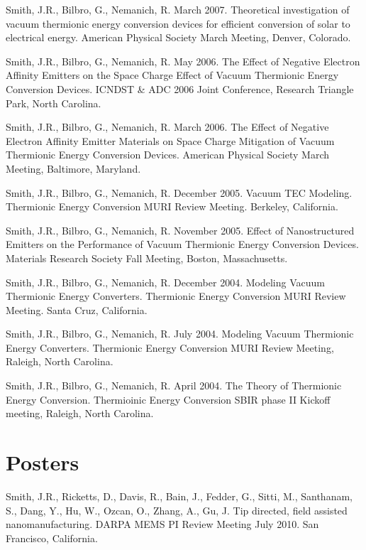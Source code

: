\documentclass[letterpaper,margin,line]{res}
\begin{document}
\begin{resume}
Smith, J.R., Bilbro, G., Nemanich, R. March 2007. Theoretical investigation of vacuum thermionic energy conversion devices for efficient conversion of solar to electrical energy. American Physical Society March Meeting, Denver, Colorado.

Smith, J.R., Bilbro, G., Nemanich, R. May 2006. The Effect of Negative Electron Affinity Emitters on the Space Charge Effect of Vacuum Thermionic Energy Conversion Devices. ICNDST \& ADC 2006 Joint Conference, Research Triangle Park, North Carolina.

Smith, J.R., Bilbro, G., Nemanich, R. March 2006. The Effect of Negative Electron Affinity Emitter Materials on Space Charge Mitigation of Vacuum Thermionic Energy Conversion Devices. American Physical Society March Meeting, Baltimore, Maryland.

Smith, J.R., Bilbro, G., Nemanich, R. December 2005. Vacuum TEC Modeling. Thermionic Energy Conversion MURI Review Meeting. Berkeley, California.

Smith, J.R., Bilbro, G., Nemanich, R. November 2005. Effect of Nanostructured Emitters on the Performance of Vacuum Thermionic Energy Conversion Devices. Materials Research Society Fall Meeting, Boston, Massachusetts.

Smith, J.R., Bilbro, G., Nemanich, R. December 2004. Modeling Vacuum Thermionic Energy Converters. Thermionic Energy Conversion MURI Review Meeting. Santa Cruz, California.

Smith, J.R., Bilbro, G., Nemanich, R. July 2004. Modeling Vacuum Thermionic Energy Converters. Thermionic Energy Conversion MURI Review Meeting, Raleigh, North Carolina.

Smith, J.R., Bilbro, G., Nemanich, R. April 2004. The Theory of Thermionic Energy Conversion. Thermioinic Energy Conversion SBIR phase II Kickoff meeting, Raleigh, North Carolina.

% 


\section{\sc Posters}
Smith, J.R., Ricketts, D., Davis, R., Bain, J., Fedder, G., Sitti, M., Santhanam, S., Dang, Y., Hu, W., Ozcan, O., Zhang, A., Gu, J. Tip directed, field assisted nanomanufacturing. DARPA MEMS PI Review Meeting July 2010. San Francisco, California.


\end{resume}
\end{document}
